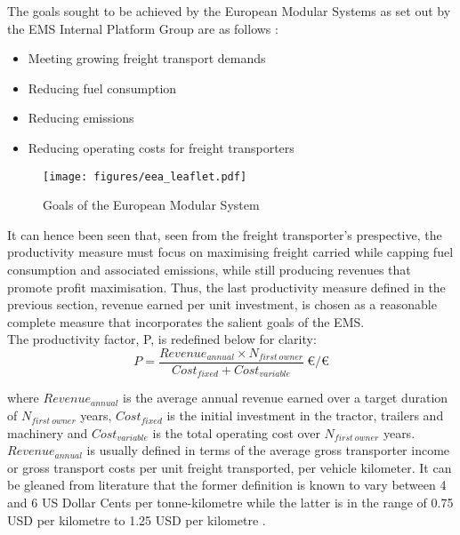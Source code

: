 \documentclass[ExampleMasters.tex]{subfiles}
\begin{document}
		The goals sought to be achieved by the European Modular Systems as set out by the EMS Internal Platform Group are as follows \cite{EMSleaflet}:
		\begin{itemize}
			\item Meeting growing freight transport demands
			\item Reducing fuel consumption
			\item Reducing emissions
			\item Reducing operating costs for freight transporters
		\end{itemize}

		\begin{figure}[h!]
			\centering
			\texttt{[image: figures/eea\_leaflet.pdf]}
			\caption{Goals of the European Modular System \cite{EMSleaflet}}
			\label{EMSleaflet}
		\end{figure}

		It can hence been seen that, seen from the freight transporter's prespective, the productivity measure must focus on maximising freight carried while capping fuel consumption and associated emissions, while still producing revenues that promote profit maximisation. Thus, the last productivity measure defined in the previous section, revenue earned per unit investment, is chosen as a reasonable complete measure that incorporates the salient goals of the EMS.\\ 

		The productivity factor, P, is redefined below for clarity:
		\begin{equation} \label{eq:productivity}
			P = \frac{Revenue_{annual} \times N_{first\ owner}}{Cost_{fixed} + Cost_{variable}}\ \euro/\euro
		\end{equation}

		where $Revenue_{annual}$ is the average annual revenue earned over a target duration of $N_{first\ owner}$ years, $Cost_{fixed}$ is the initial investment in the tractor, trailers and machinery and $Cost_{variable}$ is the total operating cost over $N_{first\ owner}$ years.\\

		$Revenue_{annual}$ is usually defined in terms of the average gross transporter income or gross transport costs per unit freight transported, per vehicle kilometer. It can be gleaned from literature that the former definition is known to vary between 4 and 6 US Dollar Cents per tonne-kilometre \cite{WorldBankReport} while the latter is in the range of 0.75 USD per kilometre to 1.25 USD per kilometre \cite{WorldBankReport}.\\
\end{document}
